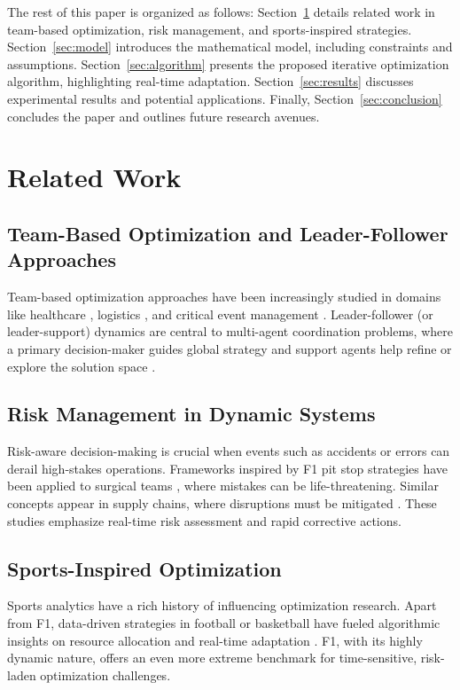 \documentclass[preprint,12pt]{elsarticle}
\begin{document}
The rest of this paper is organized as follows: Section~\ref{sec:related} details related work in team-based optimization, risk management, and sports-inspired strategies. Section~\ref{sec:model} introduces the mathematical model, including constraints and assumptions. Section~\ref{sec:algorithm} presents the proposed iterative optimization algorithm, highlighting real-time adaptation. Section~\ref{sec:results} discusses experimental results and potential applications. Finally, Section~\ref{sec:conclusion} concludes the paper and outlines future research avenues.

\section{Related Work}
\label{sec:related}

\subsection{Team-Based Optimization and Leader-Follower Approaches}
Team-based optimization approaches have been increasingly studied in domains like healthcare \cite{refMalik2023}, logistics \cite{refRamos2022}, and critical event management \cite{refSwol2022}. Leader-follower (or leader-support) dynamics are central to multi-agent coordination problems, where a primary decision-maker guides global strategy and support agents help refine or explore the solution space \cite{refKianfar2021}.

\subsection{Risk Management in Dynamic Systems}
Risk-aware decision-making is crucial when events such as accidents or errors can derail high-stakes operations. Frameworks inspired by F1 pit stop strategies have been applied to surgical teams \cite{refPearson2024}, where mistakes can be life-threatening. Similar concepts appear in supply chains, where disruptions must be mitigated \cite{refGoldhaber2023}. These studies emphasize real-time risk assessment and rapid corrective actions.

\subsection{Sports-Inspired Optimization}
Sports analytics have a rich history of influencing optimization research. Apart from F1, data-driven strategies in football or basketball have fueled algorithmic insights on resource allocation and real-time adaptation \cite{refWooldridge2023}. F1, with its highly dynamic nature, offers an even more extreme benchmark for time-sensitive, risk-laden optimization challenges.
\end{document}
